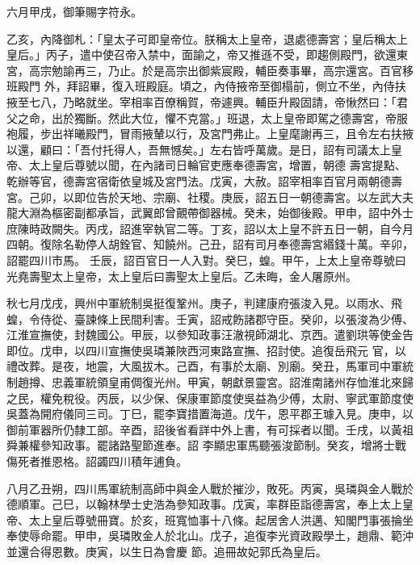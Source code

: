 \begin{pinyinscope}
 六月甲戌，御筆賜字符永。



 乙亥，內降御札：「皇太子可即皇帝位。朕稱太上皇帝，退處德壽宮；皇后稱太上皇后。」丙子，遣中使召帝入禁中，面諭之，帝又推遜不受，即趨側殿門，欲還東宮，高宗勉諭再三，乃止。於是高宗出御紫宸殿，輔臣奏事畢，高宗還宮。百官移班殿門
 外，拜詔畢，復入班殿庭。頃之，內侍掖帝至御榻前，側立不坐，內侍扶掖至七八，乃略就坐。宰相率百僚稱賀，帝遽興。輔臣升殿固請，帝愀然曰：「君父之命，出於獨斷。然此大位，懼不克當。」班退，太上皇帝即駕之德壽宮，帝服袍履，步出祥曦殿門，冒雨掖輦以行，及宮門弗止。上皇麾謝再三，且令左右扶掖以還，顧曰：「吾付托得人，吾無憾矣。」左右皆呼萬歲。是日，詔有司議太上皇帝、太上皇后尊號以聞，在內諸司日輪官吏應奉德壽宮，增置，朝德
 壽宮提點、乾辦等官，德壽宮宿衛依皇城及宮門法。戊寅，大赦。詔宰相率百官月兩朝德壽宮。己卯，以即位告於天地、宗廟、社稷。庚辰，詔五日一朝德壽宮。以左武大夫龍大淵為樞密副都承旨，武翼郎曾覿帶御器械。癸未，始御後殿。甲申，詔中外士庶陳時政闕失。丙戌，詔進宰執官二等。丁亥，詔以太上皇不許五日一朝，自今月四朝。復除名勒停人胡銓官、知饒州。己丑，詔有司月奉德壽宮緡錢十萬。辛卯，詔罷四川市馬。
 壬辰，詔百官日一人入對。癸巳，蝗。甲午，上太上皇帝尊號曰光堯壽聖太上皇帝，太上皇后曰壽聖太上皇后。乙未晦，金人屠原州。



 秋七月戊戌，興州中軍統制吳挺復鞏州。庚子，判建康府張浚入見。以雨水、飛蝗，令侍從、臺諫條上民間利害。壬寅，詔戒飭諸郡守臣。癸卯，以張浚為少傅、江淮宣撫使，封魏國公。甲辰，以參知政事汪澈視師湖北、京西。遣劉珙等使金告即位。戊申，以四川宣撫使吳璘兼陜西河東路宣撫、招討使。追復岳飛元
 官，以禮改葬。是夜，地震，大風拔木。己酉，有事於太廟、別廟。癸丑，馬軍司中軍統制趙撙、忠義軍統領皇甫倜復光州。甲寅，朝獻景靈宮。詔淮南諸州存恤淮北來歸之民，權免稅役。丙辰，以少保、保康軍節度使吳益為少傅，太尉、寧武軍節度使吳蓋為開府儀同三司。丁巳，罷李寶措置海道。戊午，恩平郡王璩入見。庚申，以御前軍器所仍隸工部。辛酉，詔後省看詳中外上書，有可採者以聞。壬戌，以黃祖舜兼權參知政事。罷諸路聖節進奉。詔
 李顯忠軍馬聽張浚節制。癸亥，增將士戰傷死者推恩格。詔蠲四川積年逋負。



 八月乙丑朔，四川馬軍統制高師中與金人戰於摧沙，敗死。丙寅，吳璘與金人戰於德順軍。己巳，以翰林學士史浩為參知政事。戊寅，率群臣詣德壽宮，奉上太上皇帝、太上皇后尊號冊寶。於亥，班寬恤事十八條。起居舍人洪邁、知閣門事張掄坐奉使辱命罷。甲申，吳璘敗金人於北山。戊子，追復李光資政殿學土，趙鼎、範沖並還合得恩數。庚寅，以生日為會慶
 節。追冊故妃郭氏為皇后。




\end{pinyinscope}
